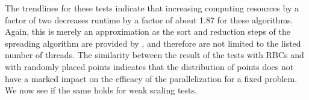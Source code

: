 The trendlines for these tests indicate that increasing computing resources
by a factor of two decreases runtime by a factor of about 1.87 for these
algorithms. Again, this is merely an approximation as the sort and reduction
steps of the spreading algorithm are provided by {\thrust}, and therefore are
not limited to the listed number of threads. The similarity between the result
of the tests with RBCs and with randomly placed points indicates that the
distribution of points does not have a marked impact on the efficacy of the
parallelization for a fixed problem. We now see if the same holds for weak
scaling tests.


